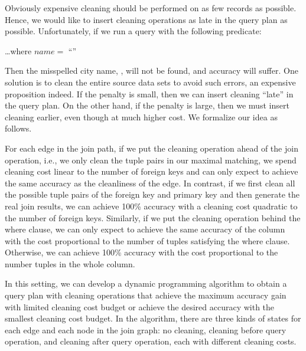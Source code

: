 Obviously expensive cleaning should be performed on as few records as possible. Hence, we would like to insert cleaning operations as late in the query plan as possible. 
Unfortunately, if we run a query with the following predicate:

\vspace{.5em}
\dots \textsf{where} $name = $ ``''
\vspace{.5em}

\noindent Then the misspelled city name,  \ie {}, will not be found, and accuracy will suffer. One solution is to clean the entire source data sets to avoid such errors, an expensive proposition indeed. If the penalty is small, then we can insert cleaning ``late'' in the query plan. On the other hand, if the penalty is large, then we must insert cleaning earlier, even though at much higher cost. We formalize our idea as follows.


For each edge in the join path, if we put the cleaning operation ahead of the join operation, i.e., we only clean the tuple pairs in our maximal matching, we spend cleaning cost linear to the number of foreign keys and can only expect to achieve the same accuracy  as the cleanliness of the edge. In contrast, if we first clean all the possible tuple pairs of the foreign key and primary key and then generate the real join results, we can achieve 100\% accuracy with a cleaning cost quadratic to the number of foreign keys. Similarly, if we put the cleaning operation behind the where clause, we can only expect to achieve the same accuracy of the column with the cost proportional to the number of tuples satisfying the where clause. Otherwise, we can achieve 100\% accuracy with the cost proportional to the number tuples in the whole column.


In this setting, we can develop a dynamic programming algorithm to obtain a query plan with cleaning operations that achieve the maximum accuracy gain with limited cleaning cost budget or achieve the desired accuracy with the smallest cleaning cost budget. In the algorithm, there are three kinds of states for each edge and each node in the join graph: 
no cleaning, cleaning before query operation, and cleaning after query operation, each with different cleaning costs.


